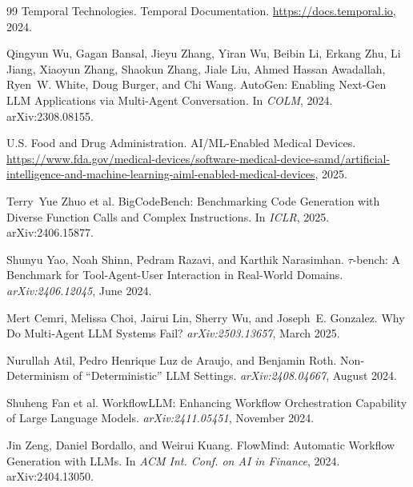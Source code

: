 \documentclass[11pt]{article}
\begin{document}
\begin{thebibliography}{99}
Temporal Technologies.
\newblock Temporal Documentation.
\newblock \url{https://docs.temporal.io}, 2024.

Qingyun Wu, Gagan Bansal, Jieyu Zhang, Yiran Wu, Beibin Li, Erkang Zhu, Li Jiang, Xiaoyun Zhang, Shaokun Zhang, Jiale Liu, Ahmed Hassan Awadallah, Ryen~W. White, Doug Burger, and Chi Wang.
\newblock AutoGen: Enabling Next-Gen LLM Applications via Multi-Agent Conversation.
\newblock In \emph{COLM}, 2024.
\newblock arXiv:2308.08155.

U.S. Food and Drug Administration.
\newblock AI/ML-Enabled Medical Devices.
\newblock \url{https://www.fda.gov/medical-devices/software-medical-device-samd/artificial-intelligence-and-machine-learning-aiml-enabled-medical-devices}, 2025.


Terry~Yue Zhuo et al.
\newblock BigCodeBench: Benchmarking Code Generation with Diverse Function Calls and Complex Instructions.
\newblock In \emph{ICLR}, 2025.
\newblock arXiv:2406.15877.

Shunyu Yao, Noah Shinn, Pedram Razavi, and Karthik Narasimhan.
\newblock $\tau$-bench: A Benchmark for Tool-Agent-User Interaction in Real-World Domains.
\newblock \emph{arXiv:2406.12045}, June 2024.

Mert Cemri, Melissa Choi, Jairui Lin, Sherry Wu, and Joseph~E. Gonzalez.
\newblock Why Do Multi-Agent LLM Systems Fail?
\newblock \emph{arXiv:2503.13657}, March 2025.

Nurullah Atil, Pedro Henrique Luz de Araujo, and Benjamin Roth.
\newblock Non-Determinism of ``Deterministic'' LLM Settings.
\newblock \emph{arXiv:2408.04667}, August 2024.

Shuheng Fan et al.
\newblock WorkflowLLM: Enhancing Workflow Orchestration Capability of Large Language Models.
\newblock \emph{arXiv:2411.05451}, November 2024.

Jin Zeng, Daniel Bordallo, and Weirui Kuang.
\newblock FlowMind: Automatic Workflow Generation with LLMs.
\newblock In \emph{ACM Int. Conf. on AI in Finance}, 2024.
\newblock arXiv:2404.13050.


\end{thebibliography}
\end{document}
